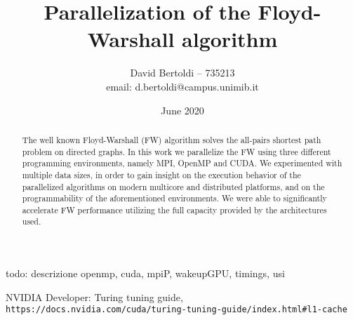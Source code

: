 \documentclass[compsoc]{IEEEtran}
\title{Parallelization of the Floyd-Warshall algorithm}
\author{David Bertoldi -- 735213 \\ email: d.bertoldi@campus.unimib.it}
\affil{Department of Informatics, Systems and Communication}
\affil{University of Milano-Bicocca}
\date{June 2020}
\begin{document}
\maketitle 



\begin{abstract}
The well known Floyd-Warshall (FW) algorithm solves the all-pairs shortest path problem on directed graphs. In this work we parallelize the FW using three different
programming environments, namely MPI, OpenMP and CUDA. We experimented with multiple data sizes, in order to gain insight on the execution behavior
of the parallelized algorithms on modern multicore and distributed platforms, and on the programmability of the aforementioned environments. We were able
to significantly accelerate FW performance utilizing the full capacity provided by the architectures used.
\end{abstract}

todo: descrizione openmp, cuda, mpiP, wakeupGPU, timings, usi

















\begin{thebibliography}{9}

NVIDIA Developer: Turing tuning guide,
\\\texttt{https://docs.nvidia.com/cuda/turing-tuning-guide/index.html\#l1-cache}
\end{thebibliography}
\end{document}
